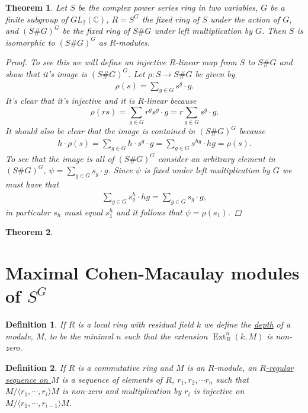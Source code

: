 \documentclass[11pt, a4paper, english]{article}
\numberwithin{prop}{section}
\numberwithin{lemma}{section}
\newtheorem{theorem}{Theorem}
\numberwithin{theorem}{section}
\newtheorem{defin}{Definition}
\numberwithin{defin}{section}
\numberwithin{example}{section}
\newcommand{\C}{\mathbb{C}}
\DeclareMathOperator{\Ext}{Ext}
\begin{document}
\begin{theorem}
Let $S$ be the complex power series ring in two variables, $G$ be a finite subgroup of $GL_2(\C)$, $R = S^G$ the fixed ring of $S$ under the action of $G$, and $(S\#G)^G$ be the fixed ring of $S\#G$ under left multiplication by $G$. Then $S$ is isomorphic to $(S\#G)^G$ as $R$-modules.

\begin{proof}
To see this we will define an injective $R$-linear map from $S$ to $S\#G$ and show that it's image is $(S\#G)^G$. Let $\rho: S \to S\#G$ be given by
\begin{align*}
\rho(s) = \sum_{g \in G} s^g \cdot g.
\end{align*}
It's clear that it's injective and it is $R$-linear because $$\rho(rs) = \sum_{g \in G} r^gs^g \cdot g = r\sum_{g \in G} s^g \cdot g.$$ It should also be clear that the image is contained in $(S\#G)^G$ because
\begin{align*}
h \cdot \rho(s) = \sum_{g \in G} h \cdot s^g \cdot g = \sum_{g \in G} s^{hg} \cdot hg = \rho(s).
\end{align*}
To see that the image is all of $(S\#G)^G$ consider an arbitrary element in $(S\#G)^G$, $\psi = \sum_{g\in G} s_g \cdot g$. Since $\psi$ is fixed under left multiplication by $G$ we must have that
\begin{align*}
\sum_{g\in G} s_g^h \cdot hg = \sum_{g\in G} s_g \cdot g,
\end{align*}
in particular $s_h$ must equal $s_1^h$ and it follows that $\psi = \rho(s_1)$.
\end{proof}
\end{theorem}

\begin{theorem}

\end{theorem}

\section{Maximal Cohen-Macaulay modules of $S^G$}
\begin{defin}
If $R$ is a local ring with residual field $k$ we define the \underline{depth} of a module, $M$, to be the minimal $n$ such that the extension $\Ext^n_R(k, M)$ is non-zero.
\end{defin}

\begin{defin}
If $R$ is a commutative ring and $M$ is an $R$-module, an \underline{$R$-regular sequence on $M$} is a sequence of elements of $R$, $r_1, r_2, \cdots r_n$ such that $M/\langle r_1, \cdots, r_i \rangle M$ is non-zero and multiplication by $r_i$ is injective on $M/\langle r_1, \cdots, r_{i-1} \rangle M$.
\end{defin}
\end{document}
